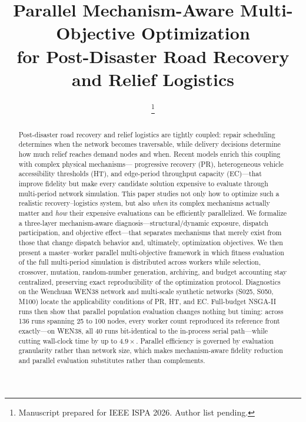 \documentclass[10pt,conference,letterpaper]{IEEEtran}
\begin{document}
\title{Parallel Mechanism-Aware Multi-Objective Optimization\\
for Post-Disaster Road Recovery and Relief Logistics}

\author{
\thanks{Manuscript prepared for IEEE ISPA 2026. Author list pending.}
}

\maketitle

\begin{abstract}
Post-disaster road recovery and relief logistics are tightly coupled:
repair scheduling determines when the network becomes traversable, while
delivery decisions determine how much relief reaches demand nodes and when.
Recent models enrich this coupling with complex physical mechanisms---%
progressive recovery (PR), heterogeneous vehicle accessibility thresholds
(HT), and edge-period throughput capacity (EC)---that improve fidelity but
make every candidate solution expensive to evaluate through multi-period
network simulation. This paper studies not only how to optimize such a
realistic recovery--logistics system, but also \emph{when} its complex
mechanisms actually matter and \emph{how} their expensive evaluations can
be efficiently parallelized. We formalize a three-layer mechanism-aware
diagnosis---structural/dynamic exposure, dispatch participation, and
objective effect---that separates mechanisms that merely exist from those
that change dispatch behavior and, ultimately, optimization objectives.
We then present a master--worker parallel multi-objective framework in
which fitness evaluation of the full multi-period simulation is distributed
across workers while selection, crossover, mutation, random-number
generation, archiving, and budget accounting stay centralized, preserving
exact reproducibility of the optimization protocol. Diagnostics on the
Wenchuan WEN38 network and multi-scale synthetic networks (S025, S050,
M100) locate the applicability conditions of PR, HT, and EC. Full-budget
NSGA-II runs then show that parallel population evaluation changes nothing
but timing: across 136 runs spanning 25 to 100 nodes, every worker count
reproduced its reference front exactly---on WEN38, all 40 runs bit-identical
to the in-process serial path---while cutting wall-clock time by up to
$4.9\times$. Parallel efficiency is governed by evaluation granularity
rather than network size, which makes mechanism-aware fidelity reduction
and parallel evaluation substitutes rather than complements.
\end{abstract}
\end{document}
